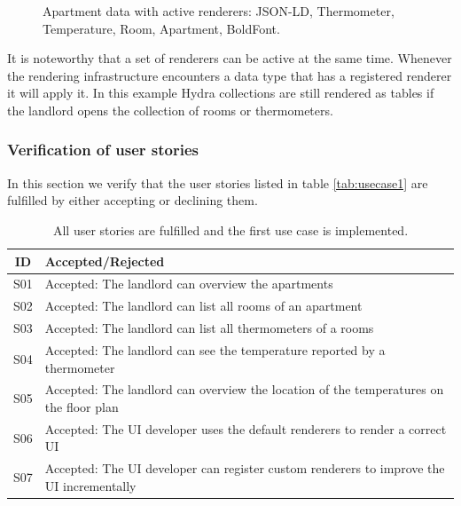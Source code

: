 \begin{figure}[!htb]
  \caption{Apartment data with active renderers: JSON-LD, Thermometer, Temperature, Room, Apartment, BoldFont.}
\end{figure}

It is noteworthy that a set of renderers can be active at the same time. Whenever the rendering infrastructure encounters a data type that has a registered renderer it will apply it. In this example Hydra collections are still rendered as tables if the landlord opens the collection of rooms or thermometers.

\subsubsection{Verification of user stories}
In this section we verify that the user stories listed in table \ref{tab:usecase1} are fulfilled by either accepting or declining them.

\begin{table}
  \begin{center}
    \begin{tabular}{ |c|l| }
      \hline
      ID & Accepted/Rejected \\
      \hline
      S01 & Accepted: The landlord can overview the apartments \\
      S02 & Accepted: The landlord can list all rooms of an apartment \\
      S03 & Accepted: The landlord can list all thermometers of a rooms \\
      S04 & Accepted: The landlord can see the temperature reported by a thermometer \\
      S05 & Accepted: The landlord can overview the location of the temperatures on the floor plan \\
      S06 & Accepted: The UI developer uses the default renderers to render a correct UI \\
      S07 & Accepted: The UI developer can register custom renderers to improve the UI incrementally \\
      \hline
    \end{tabular}
    \caption{All user stories are fulfilled and the first use case is implemented.}
  \end{center}
\end{table}

